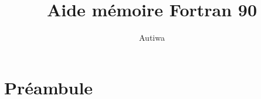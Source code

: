 \documentclass[a4paper,twoside]{article}
\title{Aide mémoire Fortran 90}
\author{Autiwa}
\begin{document}
\tableofcontents

\clearpage

\section{Préambule}
\end{document}
